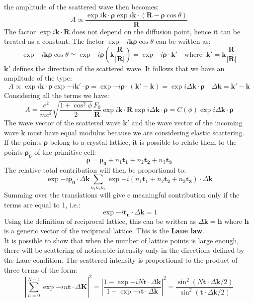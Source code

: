 \documentclass[10.75pt,a4paper,openright,bottom=2cm]{article}
\renewcommand{\Vec}[1]{\boldsymbol{#1}}
\begin{document}
the amplitude of the scattered wave then becomes:
\[
A\propto\frac{\exp{i\Vec{k}\cdot\Vec{\rho}}\exp{i\Vec{k}\cdot(\Vec{R}-\Vec{\rho}\cos\theta)}}{\Vec{R}}
\]
The factor $\exp{i\Vec{k}\cdot\Vec{R}}$ does not depend on the diffusion point, hence it can be treated as a constant. The factor $\exp{-i\Vec{k}\Vec{\rho}\cos\theta}$ can be written as:
\[
\exp{-i\Vec{k}\Vec{\rho}\cos\theta}\simeq\exp{-i\Vec{\rho}\left(\Vec{k}\frac{\Vec{R}}{|\Vec{R}|}\right)}=\exp{-i\Vec{\rho}\cdot\Vec{k}'} \quad \text{where}\;\;\Vec{k}'=\Vec{k}\frac{\Vec{R}}{|\Vec{R}|}
\]
$\Vec{k}'$ defines the direction of the scattered wave. It follows that we have an amplitude of the type:
\[
A\propto\exp{i\Vec{k}\cdot\Vec{\rho}}\exp{-i\Vec{k}'\cdot\Vec{\rho}}=\exp{-i\Vec{\rho}\cdot(\Vec{k}'-\Vec{k})}=\exp{i\Delta\Vec{k}\cdot\Vec{\rho}} \quad \Delta\Vec{k}=\Vec{k}'-\Vec{k}
\]
Considering all the terms we have:
\[
A=\frac{e^2}{mc^2}\sqrt{\frac{1+\cos^2\phi}{2}}\frac{F_0}{\Vec{R}}\exp{i\Vec{k}\cdot\Vec{R}}\exp{i\Delta\Vec{k}\cdot\Vec{\rho}}=C(\phi)\exp{i\Delta\Vec{k}\cdot\Vec{\rho}}
\]
The wave vector of the scattered wave $\Vec{k}'$ and the wave vector of the incoming wave $\Vec{k}$ must have equal modulus because we are considering elastic scattering.\\
If the points $\Vec{\rho}$ belong to a crystal lattice, it is possible to relate them to the points $\Vec{\rho_0}$ of the primitive cell:
\[
\Vec{\rho}=\Vec{\rho_0}+n_1\Vec{t_1}+n_2\Vec{t_2}+n_3\Vec{t_3}
\]
The relative total contribution will then be proportional to:
\begin{equation}
\label{rhozero}
\exp{-i\Vec{\rho_0}\cdot\Delta\Vec{k}}\sum_{n_1n_2n_3}\exp{-i(n_1\Vec{t_1}+n_2\Vec{t_2}+n_3\Vec{t_3})\cdot\Delta\Vec{k}}
\end{equation}
Summing over the translations will give e meaningful contribution only if the terms are equal to 1, i.e.:
\[
\exp{-i\Vec{t_n}\cdot\Delta\Vec{k}}=1
\]
Using the definition of reciprocal lattice, this can be written as $\Delta\Vec{k}=\Vec{h}$ where $\Vec{h}$ is a generic vector of the reciprocal lattice. This is the \textbf{Laue law}.\\
It is possible to show that when the number of lattice points is large enough, there will be scattering of noticeable intensity only in the directions defined by the Laue condition. The scattered intensity is proportional to the product of three terms of the form:
\[
\left|\sum_{n=0}^{N-1}\exp{-in\Vec{t}\cdot\Delta\Vec{K}}\right|^2=\left|\frac{1-\exp{-iN\Vec{t}\cdot\Delta\Vec{k}}}{1-\exp{-i\Vec{t}\cdot\Delta\Vec{k}}}\right|^2=\frac{\sin^2(N\Vec{t}\cdot\Delta\Vec{k}/2)}{\sin^2(\Vec{t}\cdot\Delta\Vec{k}/2)}
\]
\end{document}
